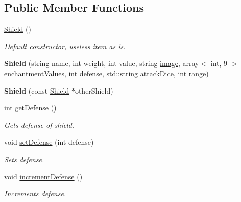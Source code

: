 \subsection*{Public Member Functions}
\begin{DoxyCompactItemize}
\item 
\hypertarget{class_shield_a8a6e827c94750d8c1a1d523cb1b105de}{}\label{class_shield_a8a6e827c94750d8c1a1d523cb1b105de} 
\hyperlink{class_shield_a8a6e827c94750d8c1a1d523cb1b105de}{Shield} ()
\begin{DoxyCompactList}\small\item\em Default constructor, useless item as is. \end{DoxyCompactList}\item 
\hypertarget{class_shield_ae3dbea08547d4547faa441e5169605ba}{}\label{class_shield_ae3dbea08547d4547faa441e5169605ba} 
{\bfseries Shield} (string name, int weight, int value, string \hyperlink{class_item_add84a42b692ee5d580a92ae4a922f784}{image}, array$<$ int, 9 $>$ \hyperlink{class_item_a8532d8729f9433f41b7fc18b20d83236}{enchantment\+Values}, int defense, std\+::string attack\+Dice, int range)
\item 
\hypertarget{class_shield_a8c77767b623247b3ce1d42cbe3d3da05}{}\label{class_shield_a8c77767b623247b3ce1d42cbe3d3da05} 
{\bfseries Shield} (const \hyperlink{class_shield}{Shield} $\ast$other\+Shield)
\item 
\hypertarget{class_shield_a92fae272ca41b96a9f38770de4ed6180}{}\label{class_shield_a92fae272ca41b96a9f38770de4ed6180} 
int \hyperlink{class_shield_a92fae272ca41b96a9f38770de4ed6180}{get\+Defense} ()
\begin{DoxyCompactList}\small\item\em Gets defense of shield. \end{DoxyCompactList}\item 
\hypertarget{class_shield_a3e421a1c80aae934300dadf6db390bf1}{}\label{class_shield_a3e421a1c80aae934300dadf6db390bf1} 
void \hyperlink{class_shield_a3e421a1c80aae934300dadf6db390bf1}{set\+Defense} (int defense)
\begin{DoxyCompactList}\small\item\em Sets defense. \end{DoxyCompactList}\item 
\hypertarget{class_shield_a4031510f895e4163ee2b447d7992e08b}{}\label{class_shield_a4031510f895e4163ee2b447d7992e08b} 
void \hyperlink{class_shield_a4031510f895e4163ee2b447d7992e08b}{increment\+Defense} ()
\begin{DoxyCompactList}\small\item\em Increments defense. \end{DoxyCompactList}\item 

\end{DoxyCompactItemize}
